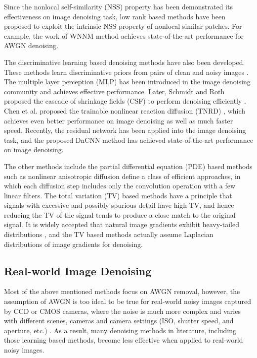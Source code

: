 Since the nonlocal self-similarity (NSS) property has been demonstrated its effectiveness on image denoising task, low rank based methods \cite{nnm,wnnm} have been proposed to exploit the intrinsic NSS property of nonlocal similar patches. For example, the work of WNNM \cite{wnnm} method achieves state-of-the-art performance for AWGN denoising. 

The discriminative learning based denoising methods have also been developed. These methods learn discriminative priors from pairs of clean and noisy images \cite{mlp,csf,tnrd, dncnn}. The multiple layer perception (MLP) \cite{mlp} has been introduced in the image denoising community and achieves effective performance. Later, Schmidt and Roth proposed the cascade of shrinkage fields (CSF) to perform denoising efficiently \cite{csf}. Chen et al. proposed the trainable nonlinear reaction diffusion (TNRD) \cite{tnrd}, which achieves even better performance on image denoising as well as much faster speed. Recently, the residual network \cite{residualnetwork} has been applied into the image denoising task, and the proposed DnCNN method \cite{dncnn} has achieved state-of-the-art performance on image denoising.


The other methods include the partial differential equation (PDE) based methods such as nonlinear anisotropic diffusion \cite{PeronaMalik1990} define a class of efficient approaches, in which each diffusion step includes only the convolution operation with a few linear filters. The total variation (TV) based methods \cite{rudin1992nonlinear,osher2005iterative} have a principle that signals with excessive and possibly spurious detail have high TV, and hence reducing the TV of the signal tends to produce a close match to the original signal. It is widely accepted that natural image gradients exhibit heavy-tailed distributions \cite{weiss}, and the TV based methods \cite{rudin1992nonlinear,osher2005iterative} actually assume Laplacian distributions of image gradients for denoising. 

\subsection{Real-world Image Denoising}
\label{sec:review:feature}

Most of the above mentioned methods focus on AWGN removal, however, the assumption of AWGN is too ideal to be true for real-world noisy images captured by CCD or CMOS cameras, where the noise is much more complex and varies with different scenes, cameras and camera settings (ISO, shutter speed, and aperture, etc.) \cite{crosschannel2016,karaimer_brown_ECCV_2016,dnd2017}. As a result, many denoising methods in literature, including those learning based methods, become less effective when applied to real-world noisy images.


